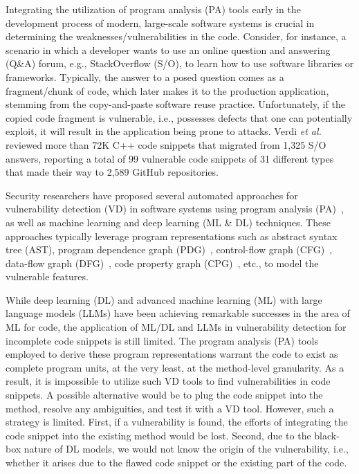 Integrating the utilization of program analysis (PA) tools early in
the development process of modern, large-scale software systems is
crucial in determining the weaknesses/vulnerabilities in the
code. Consider, for instance, a scenario in which a developer wants to
use an online question and answering (Q\&A) forum, e.g., StackOverflow
(S/O), to learn how to use software libraries or
frameworks. Typically, the answer to a posed question comes as a
fragment/chunk of code, which later makes it to the production
application, stemming from the copy-and-paste software reuse
practice. Unfortunately, if the copied code fragment is vulnerable,
i.e., possesses defects that one can potentially exploit, it will
result in the application being prone to attacks. Verdi {\em et
al.}~\cite{verdi-tse22} reviewed more than 72K C++ code snippets that
migrated from 1,325 S/O answers, reporting a total of 99 vulnerable
code snippets of 31 different types that made their way to 2,589
GitHub repositories.

Security researchers have proposed several automated approaches for
vulnerability detection (VD) in software systems using program
analysis
(PA)~\cite{FlawFinder,RATS,viega2000its4,Checkmarx,HPFortify,Coverity},
as well as machine learning and deep learning (ML \&
DL) \cite{fse21,chakraborty2020deep,zhou2019devign,li2018sysevr,li2018vuldeepecker}
techniques. These approaches typically leverage program
representations such as abstract syntax tree (AST), program dependence
graph (PDG)~\cite{fse21,li2018vuldeepecker}, control-flow graph
(CFG)~\cite{zhou2019devign}, data-flow graph
(DFG)~\cite{zhou2019devign}, code property graph
(CPG)~\cite{chakraborty2020deep}, etc., to model the vulnerable
features.

While deep learning (DL) and advanced machine learning (ML) with large
language models (LLMs) have been achieving remarkable successes in the
area of ML for code, the application of ML/DL and LLMs in
vulnerability detection for incomplete code snippets is still
limited. The program analysis (PA) tools employed to derive these
program representations warrant the code to exist as complete program
units, at the very least, at the method-level granularity. As a
result, it is impossible to utilize such VD tools to find
vulnerabilities in code snippets. A possible alternative would be to
plug the code snippet into the method, resolve any ambiguities, and
test it with a VD tool. However, such a strategy is limited. First, if
a vulnerability is found, the efforts of integrating the code snippet
into the existing method would be lost. Second, due to the black-box
nature of DL models, we would not know the origin of the
vulnerability, i.e., whether it arises due to the flawed code snippet
or the existing part of the code.

